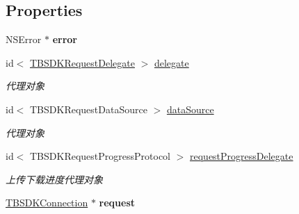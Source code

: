 \subsection*{Properties}
\begin{DoxyCompactItemize}
\item 
\mbox{\label{interface_t_b_s_d_k_request_a51a2eb0168d10bd90afca8972f223e73}} 
N\+S\+Error $\ast$ {\bfseries error}
\item 
\mbox{\label{interface_t_b_s_d_k_request_a07a7ce454c4ada13b80f24a5d4905cc9}} 
id$<$ \mbox{\hyperlink{interface_t_b_s_d_k_request_delegate}{T\+B\+S\+D\+K\+Request\+Delegate}} $>$ \mbox{\hyperlink{interface_t_b_s_d_k_request_a07a7ce454c4ada13b80f24a5d4905cc9}{delegate}}
\begin{DoxyCompactList}\small\item\em 代理对象 \end{DoxyCompactList}\item 
\mbox{\label{interface_t_b_s_d_k_request_aee97079f3e59fcf43a7b4e6f15d25217}} 
id$<$ T\+B\+S\+D\+K\+Request\+Data\+Source $>$ \mbox{\hyperlink{interface_t_b_s_d_k_request_aee97079f3e59fcf43a7b4e6f15d25217}{data\+Source}}
\begin{DoxyCompactList}\small\item\em 代理对象 \end{DoxyCompactList}\item 
\mbox{\label{interface_t_b_s_d_k_request_a01b31b6dd7518560d3338d60df7172cf}} 
id$<$ T\+B\+S\+D\+K\+Request\+Progress\+Protocol $>$ \mbox{\hyperlink{interface_t_b_s_d_k_request_a01b31b6dd7518560d3338d60df7172cf}{request\+Progress\+Delegate}}
\begin{DoxyCompactList}\small\item\em 上传下载进度代理对象 \end{DoxyCompactList}\item 
\mbox{\label{interface_t_b_s_d_k_request_a40a5400b3370941bad6e32bb92330bcf}} 
\mbox{\hyperlink{interface_t_b_s_d_k_connection}{T\+B\+S\+D\+K\+Connection}} $\ast$ {\bfseries request}
\item 
\mbox{\label{interface_t_b_s_d_k_request_a7a85f84ff882ad7fa5f1de97279d808b}} 

\end{DoxyCompactItemize}

